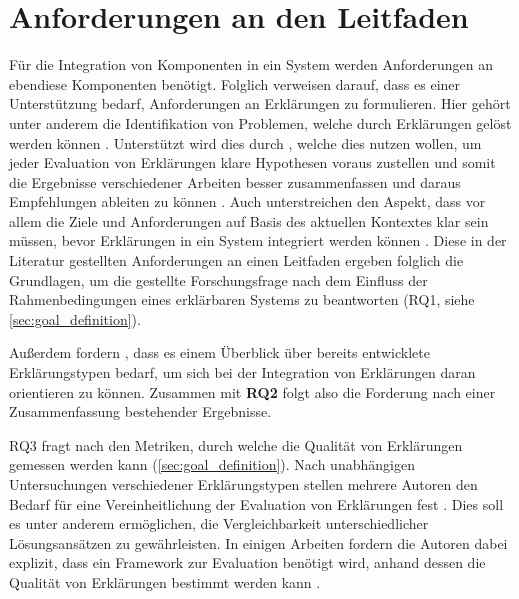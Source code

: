 \section{Anforderungen an den Leitfaden}


Für die Integration von Komponenten in ein System werden Anforderungen an ebendiese Komponenten benötigt. Folglich verweisen \citeauthor{chazette_end-users_nodate} darauf, dass es einer Unterstützung bedarf, Anforderungen an Erklärungen zu formulieren. Hier gehört unter anderem die Identifikation von Problemen, welche durch Erklärungen gelöst werden können \cite{chazette_end-users_nodate, doshi2017towards}. Unterstützt wird dies durch \citeauthor{waa_evaluating_2021}, welche dies nutzen wollen, um jeder Evaluation von Erklärungen klare Hypothesen voraus zustellen und somit die Ergebnisse verschiedener Arbeiten besser zusammenfassen und daraus Empfehlungen ableiten zu können \cite{waa_evaluating_2021}. Auch \citeauthor{kohl_explainability_2019} unterstreichen den Aspekt, dass vor allem die Ziele und Anforderungen auf Basis des aktuellen Kontextes klar sein müssen, bevor Erklärungen in ein System integriert werden können \cite{kohl_explainability_2019}. Diese in der Literatur gestellten Anforderungen an einen Leitfaden ergeben folglich die Grundlagen, um die gestellte Forschungsfrage nach dem Einfluss der Rahmenbedingungen eines erklärbaren Systems zu beantworten (RQ1, siehe \autoref{sec:goal_definition}).

Außerdem fordern \citeauthor{waa_evaluating_2021}, dass es einem Überblick über bereits entwicklete Erklärungstypen bedarf, um sich bei der Integration von Erklärungen daran orientieren zu können. Zusammen mit \textbf{RQ2} folgt also die Forderung nach einer Zusammenfassung bestehender Ergebnisse.

RQ3 fragt nach den Metriken, durch welche die Qualität von Erklärungen gemessen werden kann (\autoref{sec:goal_definition}). Nach unabhängigen Untersuchungen verschiedener Erklärungstypen stellen mehrere Autoren den Bedarf für eine Vereinheitlichung der Evaluation von Erklärungen fest \cite{cirqueira_scenario-based_2020,zahedi_towards_2019, nunes_systematic_2017, martin_evaluating_2021}. Dies soll es unter anderem ermöglichen, die Vergleichbarkeit unterschiedlicher Lösungsansätzen zu gewährleisten. In einigen Arbeiten fordern die Autoren dabei explizit, dass ein Framework zur Evaluation benötigt wird, anhand dessen die Qualität von Erklärungen bestimmt werden kann \cite{nunes_systematic_2017,sokol_explainability_2020,chari_explanation_2020}.

